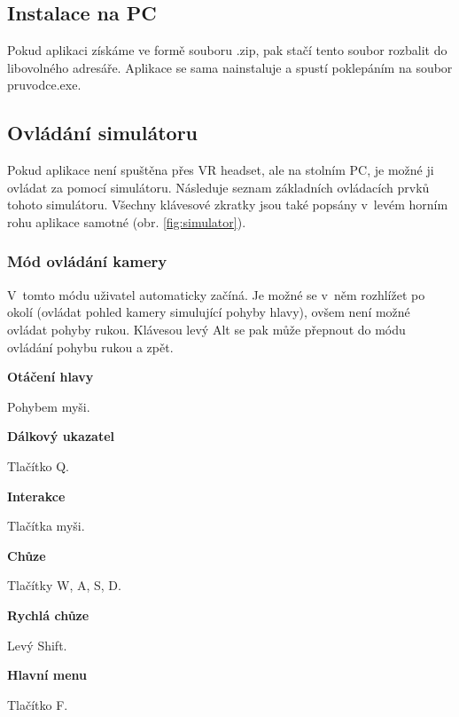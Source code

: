 \documentclass[thesis=B,czech]{FITthesis}[2012/06/26]
\begin{document}
\subsection{Instalace na PC}	
	Pokud aplikaci získáme ve formě souboru .zip, pak stačí tento soubor rozbalit do libovolného adresáře. Aplikace se sama nainstaluje a spustí poklepáním na soubor pruvodce.exe.
	
\subsection{Ovládání simulátoru}
Pokud aplikace není spuštěna přes VR headset, ale na stolním PC, je možné ji ovládat za pomocí simulátoru.\cite{VRTK} Následuje seznam základních ovládacích prvků tohoto simulátoru. Všechny klávesové zkratky jsou také popsány v~levém horním rohu aplikace samotné (obr. \ref{fig:simulator}).

\subsubsection{Mód ovládání kamery}
V~tomto módu uživatel automaticky začíná. Je možné se v~něm rozhlížet po okolí (ovládat pohled kamery simulující pohyby hlavy), ovšem není možné ovládat pohyby rukou. Klávesou levý Alt se pak může přepnout do módu ovládání pohybu rukou a zpět.


\begin{description}

	\item \textbf{Otáčení hlavy}
	
	Pohybem myši. 
	
	\item \textbf{Dálkový ukazatel}
	
	Tlačítko Q.		
	
	\item \textbf{Interakce}
	
	Tlačítka myši.
	
	
	\item \textbf{Chůze}
	
	Tlačítky W, A, S, D.	
	
	
	\item \textbf{Rychlá chůze}
	
	Levý Shift.
	
	\item \textbf{Hlavní menu}
	
	Tlačítko F.
	
\end{description}
\end{document}
